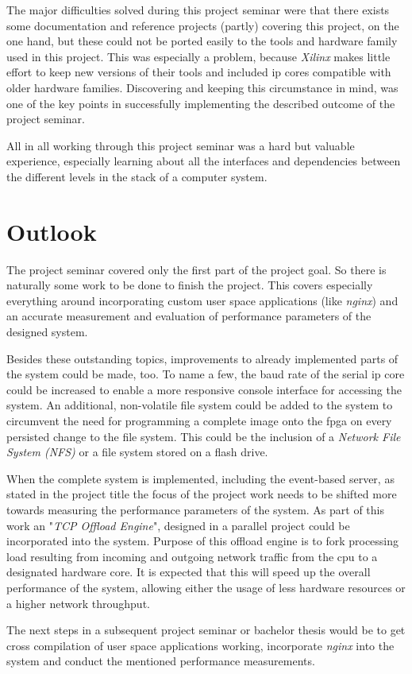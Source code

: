 The major difficulties solved during this project seminar were that there exists some documentation and reference projects (partly) covering this project, on the one hand, but these could not be ported easily to the tools and hardware family used in this project. This was especially a problem, because \textit{Xilinx} makes little effort to keep new versions of their tools and included \gls{ip} cores compatible with older hardware families. Discovering and keeping this circumstance in mind, was one of the key points in successfully implementing the described outcome of the project seminar.

All in all working through this project seminar was a hard but valuable experience, especially learning about all the interfaces and dependencies between the different levels in the stack of a computer system.

\section{Outlook}

The project seminar covered only the first part of the project goal. So there is naturally some work to be done to finish the project. This covers especially everything around incorporating custom user space applications (like \textit{nginx}) and an accurate measurement and evaluation of performance parameters of the designed system.

Besides these outstanding topics, improvements to already implemented parts of the system could be made, too. To name a few, the baud rate of the serial \gls{ip} core could be increased to enable a more responsive console interface for accessing the system. An additional, non-volatile file system could be added to the system to circumvent the need for programming a complete image onto the \gls{fpga} on every persisted change to the file system. This could be the inclusion of a \textit{Network File System (NFS)} or a file system stored on a flash drive.

When the complete system is implemented, including the event-based server, as stated in the project title the focus of the project work needs to be shifted more towards measuring the performance parameters of the system. As part of this work an "\textit{TCP Offload Engine}", designed in a parallel project could be incorporated into the system. Purpose of this offload engine is to fork processing load resulting from incoming and outgoing network traffic from the \gls{cpu} to a designated hardware core. It is expected that this will speed up the overall performance of the system, allowing either the usage of less hardware resources or a higher network throughput.

The next steps in a subsequent project seminar or bachelor thesis would be to get  cross compilation of user space applications working, incorporate \textit{nginx} into the system and conduct the mentioned performance measurements.